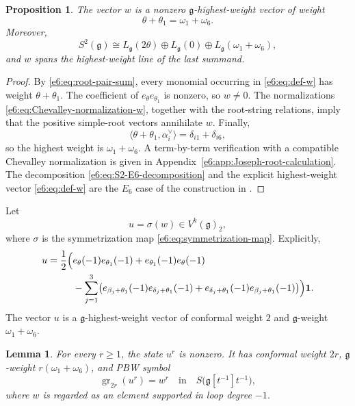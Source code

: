 \documentclass[11pt,reqno]{amsart}
\newtheorem{lemma}[theorem]{Lemma}
\newtheorem{proposition}[theorem]{Proposition}
\theoremstyle{definition}
\theoremstyle{remark}
\begin{document}
\begin{proposition}
The vector $w$ is a nonzero $\mathfrak g$-highest-weight vector of weight
\[
  \theta+\theta_1=\omega_1+\omega_6.
\]
Moreover,
\begin{equation}\label{e6:eq:S2-E6-decomposition}
  S^2(\mathfrak g)
  \cong
  L_{\mathfrak g}(2\theta)
  \oplus L_{\mathfrak g}(0)
  \oplus L_{\mathfrak g}(\omega_1+\omega_6),
\end{equation}
and $w$ spans the highest-weight line of the last summand.
\end{proposition}

\begin{proof}
By \eqref{e6:eq:root-pair-sum}, every monomial occurring in \eqref{e6:eq:def-w} has
weight $\theta+\theta_1$.  The coefficient of $e_\theta e_{\theta_1}$ is nonzero,
so $w\neq0$.  The normalizations \eqref{e6:eq:Chevalley-normalization-w}, together
with the root-string relations, imply that the positive simple-root vectors
annihilate $w$.  Finally,
\[
  \bigl\langle\theta+\theta_1,\alpha_i^\vee\bigr\rangle
  =\delta_{i1}+\delta_{i6},
\]
so the highest weight is $\omega_1+\omega_6$.  A term-by-term verification with a compatible Chevalley normalization is given in
Appendix~\ref{e6:app:Joseph-root-calculation}.  The decomposition
\eqref{e6:eq:S2-E6-decomposition} and the explicit highest-weight vector
\eqref{e6:eq:def-w} are the $E_6$ case of the construction in
\cite[Section~2 and Theorem~4.2]{ArakawaMoreau2018}.
\end{proof}

Let
\begin{equation}\label{e6:eq:def-u}
  u=\sigma(w)\in V^k(\mathfrak g)_2,
\end{equation}
where $\sigma$ is the symmetrization map \eqref{e6:eq:symmetrization-map}.  Explicitly,
\begin{align}
  u=\frac12\Bigl(&e_\theta(-1)e_{\theta_1}(-1)
                  +e_{\theta_1}(-1)e_\theta(-1) \notag\\
   &-\sum_{j=1}^{3}
     \bigl(
       e_{\beta_j+\theta_1}(-1)e_{\delta_j+\theta_1}(-1)
       +e_{\delta_j+\theta_1}(-1)e_{\beta_j+\theta_1}(-1)
     \bigr)
  \Bigr)\mathbf1.
  \label{e6:eq:explicit-u}
\end{align}
The vector $u$ is a $\mathfrak g$-highest-weight vector of conformal weight $2$
and $\mathfrak g$-weight $\omega_1+\omega_6$.

\begin{lemma}\label{e6:lem:PBW-powers-u}
For every $r\geq1$, the state $u^r$ is nonzero.  It has conformal weight $2r$,
$\mathfrak g$-weight $r(\omega_1+\omega_6)$, and PBW symbol
\begin{equation}\label{e6:eq:PBW-symbol-u-power}
  \operatorname{gr}_{2r}(u^r)=w^r
  \quad\text{in}\quad
  S\bigl(\mathfrak g[t^{-1}]t^{-1}\bigr),
\end{equation}
where $w$ is regarded as an element supported in loop degree $-1$.
\end{lemma}
\end{document}
